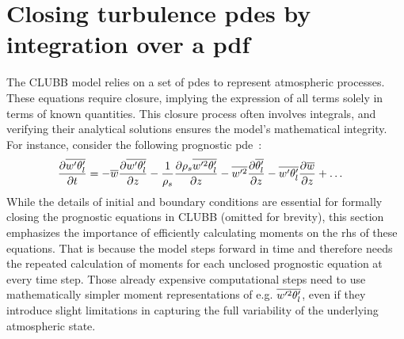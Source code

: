 \section{Closing turbulence pdes by integration over a pdf}
\label{sec:closing-turbulence-pdes-by-integration-over-a-pdf}

The \gls{CLUBB} model relies on a set of \glspl{pde} to represent atmospheric processes.
These equations require closure,
implying the expression of all terms solely in terms of known quantities.
This closure process often involves integrals,
and verifying their analytical solutions ensures the model's mathematical integrity.
For instance, consider the following prognostic \gls{pde}~\autocite[p. 21]{larson2022clubbsilhs}:
\begin{align*}
    \frac{\partial \overline{w' \theta_l'}}{\partial t}
    &= -\overline{w}\frac{\partial \overline{w' \theta_l'}}{\partial z}
    - \frac{1}{\rho_s} \frac{\partial \rho_s \overline{w'^2 \theta_l'}}{\partial z}
    - \overline{w'^2} \frac{\partial \overline{\theta_l'}}{\partial z}
    - \overline{w' \theta_l'} \frac{\partial \overline{w}}{\partial z}
    + \ldots
\end{align*}
While the details of initial and boundary conditions are essential
for formally closing the prognostic equations in \gls{CLUBB} (omitted for brevity),
this section emphasizes the importance of efficiently calculating moments
on the \gls{rhs} of these equations.
That is because the model steps forward in time
and therefore needs the repeated calculation of moments
for each unclosed prognostic equation at every time step.
Those already expensive computational steps need to use mathematically simpler moment representations
of e.g. $\overline{w'^2 \theta_l'}$, even if they introduce slight limitations
in capturing the full variability of the underlying atmospheric state.
